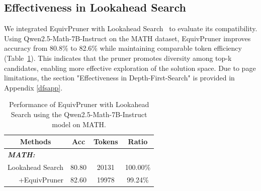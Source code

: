 \documentclass[11pt]{article}
\begin{document}
\subsection{Effectiveness in Lookahead Search}
We integrated EquivPruner with Lookahead Search~\cite{snell2025scaling} to evaluate its compatibility. Using Qwen2.5-Math-7B-Instruct on the MATH dataset, EquivPruner improves accuracy from 80.8\% to 82.6\% while maintaining comparable token efficiency (Table~\ref{tab:lookahead}). This indicates that the pruner promotes diversity among top-k candidates, enabling more effective exploration of the solution space. Due to page limitations, the section "Effectiveness in Depth-First-Search" is provided in Appendix \ref{dfsapp}.
\begin{table}[t]
\centering
\caption{
Performance of EquivPruner with Lookahead Search using the Qwen2.5-Math-7B-Instruct model on MATH.}
\label{tab:lookahead}
\begin{tabular}{cccc}
\hline
Methods                                      & Acc                  & Tokens                        & Ratio                \\ \hline
\multicolumn{1}{l}{\textit{\textbf{MATH:}}}  & \multicolumn{1}{l}{} & \multicolumn{1}{l}{\textbf{}} & \multicolumn{1}{l}{} \\
Lookahead Search                                          & 80.80                & 20131                & 100.00\%             \\
\multicolumn{1}{r}{+EquivPruner}             & 82.60                & 19978                & 99.24\%              \\ \hline
\end{tabular}
\end{table}

\end{document}
